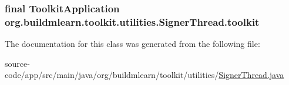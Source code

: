 \subsubsection[{\texorpdfstring{toolkit}{toolkit}}]{\setlength{\rightskip}{0pt plus 5cm}final {\bf Toolkit\+Application} org.\+buildmlearn.\+toolkit.\+utilities.\+Signer\+Thread.\+toolkit\hspace{0.3cm}{\ttfamily [private]}}\hypertarget{classorg_1_1buildmlearn_1_1toolkit_1_1utilities_1_1SignerThread_a22e92e416784f287e5e16a55763364e2}{}\label{classorg_1_1buildmlearn_1_1toolkit_1_1utilities_1_1SignerThread_a22e92e416784f287e5e16a55763364e2}


The documentation for this class was generated from the following file\+:\begin{DoxyCompactItemize}
\item 
source-\/code/app/src/main/java/org/buildmlearn/toolkit/utilities/\hyperlink{SignerThread_8java}{Signer\+Thread.\+java}\end{DoxyCompactItemize}
